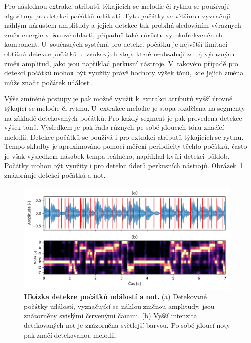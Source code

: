 Pro následnou extrakci atributů týkajících se melodie či rytmu se používají algoritmy pro detekci počátků událostí. Tyto počátky se většinou vyznačují náhlým nárůstem amplitudy a jejich detekce tak probíhá sledováním výrazných změn energie v~časové oblasti, případně také nárůstu vysokofrekvenčních komponent. U~současných systémů pro detekci počátků je největší limitací obtížná detekce počátků u~zvukových stop, které neobsahují zdroj výrazných změn amplitud, jako jsou například perkusní nástroje. V~takovém případě pro detekci počátků mohou být využity právě hodnoty výšek tónů, kde jejich změna může značit počátek události.\cite{MIR}\cite{aca}

Výše zmíněné postupy je pak možné využít k~extrakci atributů vyšší úrovně týkající se melodie či rytmu. U~extrakce melodie je stopa rozdělena na segmenty na základě detekovaných počátků. Pro každý segment je pak provedena detekce výšek tónů. Výsledkem je pak řada různých po sobě jdoucích tónu značící melodii. Detekce počátků se používá i pro extrakci atributů týkajících se rytmu. Tempo skladby je aproximováno pomocí měření periodicity těchto počátků, často je však výsledkem násobek tempa reálného, například kvůli detekci půldob. Počátky mohou být využity i pro detekci úderů perkusních nástrojů. Obrázek~\ref{obr_detekce_pocatku_a_not} znázorňuje detekci počátků a not.\cite{MIR}\cite{aca}

\begin{figure}[h]
    \centering
    \includegraphics[width=\textwidth]{obrazky/detekce_pocatku_chroma.pdf}
    \caption{\textbf{Ukázka detekce počátků událostí a not.} (a) Detekované počátky událostí, vyznačující se náhlou změnou amplitudy, jsou znázorněny svislými červenými čarami. (b) Vyšší intenzita detekovaných not je znázorněna světlejší barvou. Po sobě jdoucí noty pak značí detekovanou melodii.}
    \label{obr_detekce_pocatku_a_not}
\end{figure}

